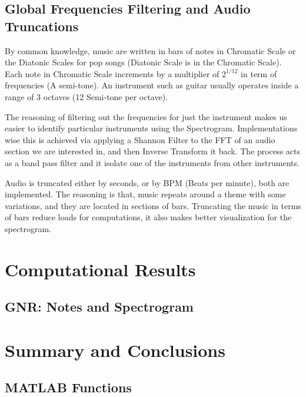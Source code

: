 \documentclass{article}
\begin{document}
    \subsection{Global Frequencies Filtering and Audio Truncations}
        \par\hspace{1.1em}
        By common knowledge, music are written in bars of notes in Chromatic Scale or the Diatonic Scales for pop songs (Diatonic Scale is in the Chromatic Scale). Each note in Chromatic Scale increments by a multiplier of $2^{1/12}$ in term of frequencies (A semi-tone). An instrument such as guitar usually operates inside a range of 3 octaves (12 Semi-tone per octave). 
        \par
        The reasoning of filtering out the frequencies for just the instrument makes us easier to identify particular instruments using the Spectrogram. Implementations wise this is achieved via applying a Shannon Filter to the FFT of an audio section we are interested in, and then Inverse Transform it back. The process acts as a band pass filter and it isolate one of the instruments from other instruments. 
        \par
        Audio is truncated either by seconds, or by BPM (Beats per minute), both are implemented. The reasoning is that, music repeats around a theme with some variations, and they are located in sections of bars. Truncating the music in terms of bars reduce loads for computations, it also makes better visualization for the spectrogram. 

\section{Computational Results}
    \subsection{GNR: Notes and Spectrogram}
    

\section{Summary and Conclusions}
   
\printbibliography

\begin{appendices}

\section{MATLAB Functions}

    
\end{appendices}
\end{document}
